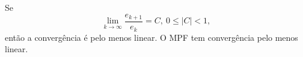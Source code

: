 \begin{prop}
    Se 
    \begin{equation}\label{conv}
        \lim_{k \to \infty} \frac{e_{k+1}}{e_k} = C, \ 0 \leq |C| < 1,
    \end{equation}
    então a convergência é pelo menos linear. O MPF tem convergência pelo menos linear.
\end{prop}
